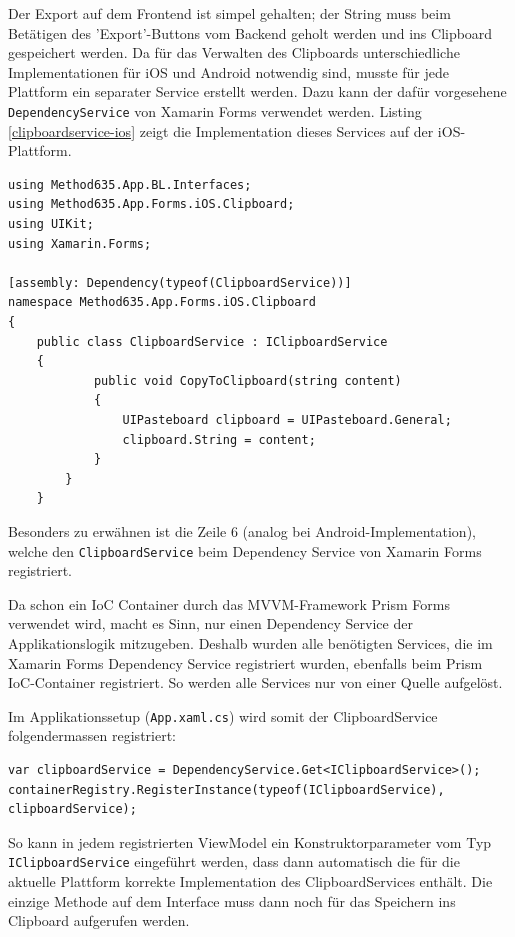 Der Export auf dem Frontend ist simpel gehalten; der String muss beim Betätigen des 'Export'-Buttons vom Backend geholt werden und ins Clipboard gespeichert werden. Da für das Verwalten des Clipboards unterschiedliche Implementationen für iOS und Android notwendig sind, musste für jede Plattform ein separater Service erstellt werden. Dazu kann der dafür vorgesehene \texttt{DependencyService} von Xamarin Forms verwendet werden. Listing \ref{clipboardservice-ios} zeigt die Implementation dieses Services auf der iOS-Plattform.
\begin{lstlisting}[morekeywords={assembly,namespace,typeof,string}, label={clipboardservice-ios},caption={Clipboard Service auf iOS}]
using Method635.App.BL.Interfaces;
using Method635.App.Forms.iOS.Clipboard;
using UIKit;
using Xamarin.Forms;

[assembly: Dependency(typeof(ClipboardService))]
namespace Method635.App.Forms.iOS.Clipboard
{
	public class ClipboardService : IClipboardService
	{
			public void CopyToClipboard(string content)
			{
				UIPasteboard clipboard = UIPasteboard.General;
				clipboard.String = content;
			}
		}
	}
\end{lstlisting}
Besonders zu erwähnen ist die Zeile 6 (analog bei Android-Implementation), welche den \texttt{ClipboardService} beim Dependency Service von Xamarin Forms registriert. 

Da schon ein IoC Container durch das MVVM-Framework Prism Forms verwendet wird, macht es Sinn, nur einen Dependency Service der Applikationslogik mitzugeben. Deshalb wurden alle benötigten Services, die im Xamarin Forms Dependency Service registriert wurden, ebenfalls beim Prism IoC-Container registriert. So werden alle Services nur von einer Quelle aufgelöst.

Im Applikationssetup (\texttt{App.xaml.cs}) wird somit der ClipboardService folgendermassen registriert:
\begin{lstlisting}
var clipboardService = DependencyService.Get<IClipboardService>();
containerRegistry.RegisterInstance(typeof(IClipboardService), clipboardService);
\end{lstlisting}
So kann in jedem registrierten ViewModel ein Konstruktorparameter vom Typ \texttt{IClipboard\-Service} eingeführt werden, dass dann automatisch die für die aktuelle Plattform korrekte Implementation des ClipboardServices enthält. Die einzige Methode auf dem Interface muss dann noch für das Speichern ins Clipboard aufgerufen werden. 


